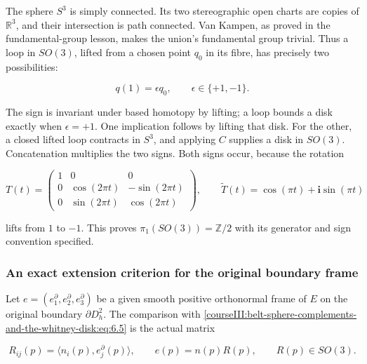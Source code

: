 The sphere \(S^3\) is simply connected. Its two stereographic open charts are copies of \(\mathbb R^3\), and their intersection is path connected. Van Kampen, as proved in the fundamental-group lesson, makes the union's fundamental group trivial. Thus a loop in \(SO(3)\), lifted from a chosen point \(q_0\) in its fibre, has precisely two possibilities:

\begin{equation}
q(1)=\epsilon q_0,\qquad \epsilon\in\{+1,-1\}.
\label{courseIII:belt-sphere-complements-and-the-whitney-disk:eq:6.8}
\end{equation}

The sign is invariant under based homotopy by lifting; a loop bounds a disk exactly when \(\epsilon=+1\). One implication follows by lifting that disk. For the other, a closed lifted loop contracts in \(S^3\), and applying \(C\) supplies a disk in \(SO(3)\). Concatenation multiplies the two signs. Both signs occur, because the rotation

\begin{equation}
T(t)=
\begin{pmatrix}
1&0&0\\
0&\cos(2\pi t)&-\sin(2\pi t)\\
0&\sin(2\pi t)&\cos(2\pi t)
\end{pmatrix},
\qquad
\widetilde T(t)=\cos(\pi t)+\mathbf i\sin(\pi t)
\label{courseIII:belt-sphere-complements-and-the-whitney-disk:eq:6.9}
\end{equation}

lifts from \(1\) to \(-1\). This proves \(\pi_1(SO(3))=\mathbb Z/2\) with its generator and sign convention specified.

\subsubsection{An exact extension criterion for the original boundary frame}
\label{courseIII:belt-sphere-complements-and-the-whitney-disk:section-6.3}

Let \(e=(e_1^\partial,e_2^\partial,e_3^\partial)\) be a given smooth positive orthonormal frame of \(E\) on the original boundary \(\partial D_h^2\). The comparison with \eqref{courseIII:belt-sphere-complements-and-the-whitney-disk:eq:6.5} is the actual matrix

\begin{equation}
R_{ij}(p)=\langle n_i(p),e_j^\partial(p)\rangle,\qquad
e(p)=n(p)R(p),\qquad R(p)\in SO(3).
\label{courseIII:belt-sphere-complements-and-the-whitney-disk:eq:6.10}
\end{equation}

